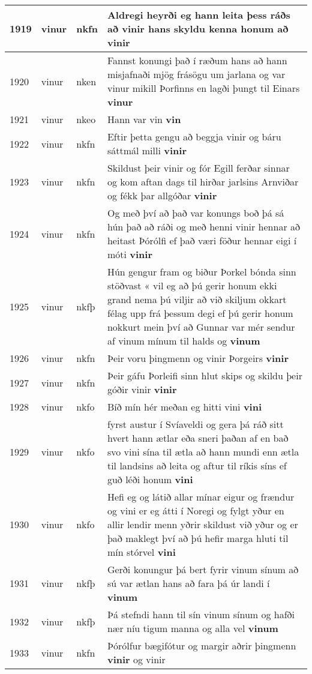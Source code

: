 \documentclass{article}
\begin{document}
\begin{longtable}{p{1cm}|p{1cm}|p{1cm}|p{13cm}}
\hline
1919&vinur&nkfn&Aldregi heyrði eg hann leita þess ráðs að vinir hans skyldu kenna honum að \textbf{vinir} \\
\hline
1920&vinur&nken&Fannst konungi það í ræðum hans að hann misjafnaði mjög frásögu um jarlana og var vinur mikill Þorfinns en lagði þungt til Einars \textbf{vinur} \\
\hline
1921&vinur&nkeo&Hann var vin \textbf{vin} \\
\hline
1922&vinur&nkfn&Eftir þetta gengu að beggja vinir og báru sáttmál milli \textbf{vinir} \\
\hline
1923&vinur&nkfn&Skildust þeir vinir og fór Egill ferðar sinnar og kom aftan dags til hirðar jarlsins Arnviðar og fékk þar allgóðar \textbf{vinir} \\
\hline
1924&vinur&nkfn&Og með því að það var konungs boð þá sá hún það að ráði og með henni vinir hennar að heitast Þórólfi ef það væri föður hennar eigi í móti \textbf{vinir} \\
\hline
1925&vinur&nkfþ&Hún gengur fram og biður Þorkel bónda sinn stöðvast « vil eg að þú gerir honum ekki grand nema þú viljir að við skiljum okkart félag upp frá þessum degi ef þú gerir honum nokkurt mein því að Gunnar var mér sendur af vinum mínum til halds og \textbf{vinum} \\
\hline
1926&vinur&nkfn&Þeir voru þingmenn og vinir Þorgeirs \textbf{vinir} \\
\hline
1927&vinur&nkfn&Þeir gáfu Þorleifi sinn hlut skips og skildu þeir góðir vinir \textbf{vinir} \\
\hline
1928&vinur&nkfo&Bíð mín hér meðan eg hitti vini \textbf{vini} \\
\hline
1929&vinur&nkfo&fyrst austur í Svíaveldi og gera þá ráð sitt hvert hann ætlar eða sneri þaðan af en bað svo vini sína til ætla að hann mundi enn ætla til landsins að leita og aftur til ríkis síns ef guð léði honum \textbf{vini} \\
\hline
1930&vinur&nkfo&Hefi eg og látið allar mínar eigur og frændur og vini er eg átti í Noregi og fylgt yður en allir lendir menn yðrir skildust við yður og er það maklegt því að þú hefir marga hluti til mín stórvel \textbf{vini} \\
\hline
1931&vinur&nkfþ&Gerði konungur þá bert fyrir vinum sínum að sú var ætlan hans að fara þá úr landi í \textbf{vinum} \\
\hline
1932&vinur&nkfþ&Þá stefndi hann til sín vinum sínum og hafði nær níu tigum manna og alla vel \textbf{vinum} \\
\hline
1933&vinur&nkfn&Þórólfur bægifótur og margir aðrir þingmenn \textbf{vinir} og vinir\\

\end{longtable}
\end{document}
